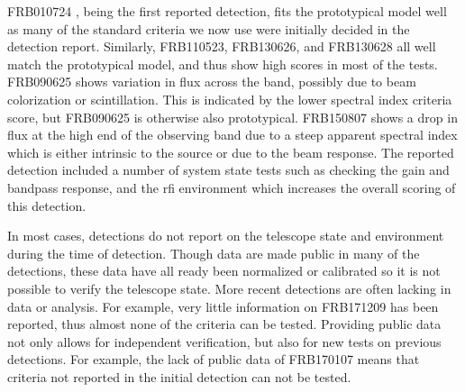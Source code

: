 \documentclass[a4paper,fleqn,usenatbib]{mnras}
\begin{document}
FRB010724 \citep{2007Sci...318..777L}, being the first reported detection, fits
the prototypical model well as many of the standard criteria we now use were
initially decided in the detection report.  Similarly, FRB110523, FRB130626, and
FRB130628 all well match the prototypical model, and thus show high scores in
most of the tests. FRB090625 shows variation in flux across the band, possibly
due to beam colorization or scintillation.  This is indicated by the lower
spectral index criteria score, but FRB090625 is otherwise also prototypical.
FRB150807 shows a drop in flux at the high end of the observing band due to a
steep apparent spectral index which is either intrinsic to the source or due to
the beam response. The reported detection included a number of system state
tests such as checking the gain and bandpass response, and the \gls{rfi}
environment which increases the overall scoring of this detection.

In most cases, detections do not report on the telescope state and environment
during the time of detection. Though data are made public in many of the
detections, these data have all ready been normalized or calibrated so it is not
possible to verify the telescope state.  More recent detections are often
lacking in data or analysis. For example, very little information on FRB171209
has been reported, thus almost none of the criteria can be tested.  Providing
public data not only allows for independent verification, but also for new tests
on previous detections.  For example, the lack of public data of FRB170107 means
that criteria not reported in the initial detection can not be tested.
\end{document}
